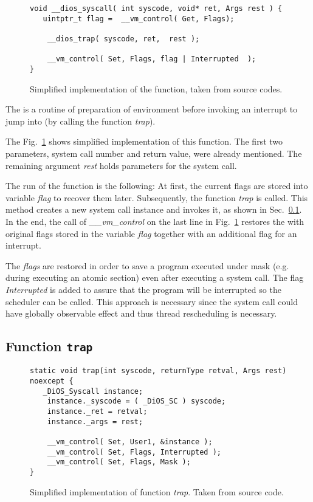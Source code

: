 \begin{figure}[h!]
\begin{lstlisting}[style=C]
void __dios_syscall( int syscode, void* ret, Args rest ) {
   uintptr_t flag =  __vm_control( Get, Flags);
                 
    __dios_trap( syscode, ret,  rest );
 
    __vm_control( Set, Flags, flag | Interrupted  ); 
} 
\end{lstlisting}
\caption{
       Simplified implementation of the \diossyscall function, taken from \divine source codes.
    }
  \label{fig:diosSyscall}
\end{figure}

The \diossyscall is a \dios routine of preparation of environment before invoking an interrupt to jump into \dios (by calling the function \textit{trap}).

The Fig.~\ref{fig:diosSyscall} shows simplified implementation of this function. The first two parameters, system call number and return value, were already mentioned. The remaining argument \textit{rest} holds parameters for the system call.

The run of the function is the following: At first, the current flags are stored into variable \textit{flag} to recover them later. 
Subsequently, the function \textit{trap} is called. This method creates a new system call instance and invokes it, as shown in Sec.~\ref{sec:impl:trap}. In the end, the call of \textit{\_\_vm\_control} on the last line in Fig.~\ref{fig:diosSyscall} restores the \dios with original flags stored in the variable \textit{flag} together with an additional flag for an interrupt.

The \textit{flags} are restored in order to save a program executed under mask (e.g. during executing an atomic section) even after executing a system call. The flag \textit{Interrupted} is added to assure that the program will be interrupted so the scheduler can be called. This approach is necessary since the system call could have globally observable effect and thus thread rescheduling is necessary.

\subsection{Function \texttt{trap}} \label{sec:impl:trap}

\begin{figure}[h!]
\begin{lstlisting}[style=C]
 static void trap(int syscode, returnType retval, Args rest) noexcept {
   _DiOS_Syscall instance;
    instance._syscode = ( _DiOS_SC ) syscode;
    instance._ret = retval;
    instance._args = rest;
    
    __vm_control( Set, User1, &instance );
    __vm_control( Set, Flags, Interrupted );
    __vm_control( Set, Flags, Mask );
} 
\end{lstlisting}
\caption{
       Simplified implementation of function \textit{trap}. Taken from \divine source code.
    }
  \label{fig:impl:trap}
\end{figure}

